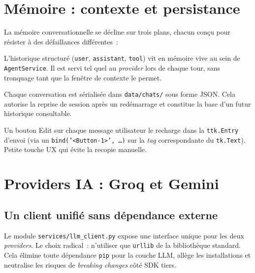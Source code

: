 \documentclass[11pt,a4paper]{report}
\begin{document}
\section{M\'emoire : contexte et persistance}

La m\'emoire conversationnelle se d\'ecline sur trois plans, chacun
con\c{c}u pour r\'esister \`a des d\'efaillances diff\'erentes~:

\begin{description}[font=\sffamily\bfseries\color{accent}]
    \item[M\'emoire de session (volatile)]
        L'historique structur\'e (\texttt{user},
        \texttt{assistant}, \texttt{tool}) vit en m\'emoire vive au
        sein de \texttt{AgentService}. Il est servi tel quel au
        \textit{provider} lors de chaque tour, sans tronquage tant
        que la fen\^etre de contexte le permet.

    \item[Persistance disque (JSON)]
        Chaque conversation est s\'erialis\'ee dans
        \texttt{data/chats/} sous forme JSON. Cela autorise la
        reprise de session apr\`es un red\'emarrage et constitue la
        base d'un futur historique consultable.

    \item[Reprise inline d'un prompt]
        Un bouton \og Edit \fg{} sur chaque message utilisateur le
        recharge dans la \texttt{ttk.Entry} d'envoi (via un
        \texttt{bind('<Button-1>', \dots)} sur la \textit{tag}
        correspondante du \texttt{tk.Text}). Petite touche UX qui
        \'evite la recopie manuelle.
\end{description}

\section{Providers IA : Groq et Gemini}

\subsection{Un client unifi\'e sans d\'ependance externe}

Le module \texttt{services/llm\_client.py} expose une interface
unique pour les deux \textit{providers}. Le choix radical~:
n'utiliser que \texttt{urllib} de la biblioth\`eque standard. Cela
\'elimine toute d\'ependance \texttt{pip} pour la couche LLM,
all\`ege les installations et neutralise les risques de
\textit{breaking changes} c\^ot\'e SDK tiers.
\end{document}

